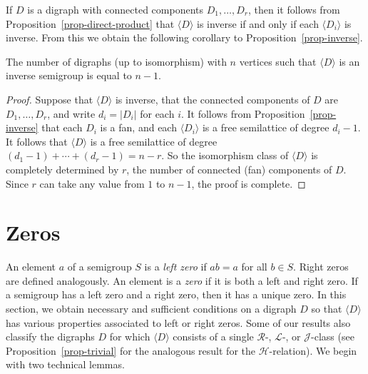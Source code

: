 \documentclass[ALCO,ThmDefs,Unicode,epreuves]{cedram}
\newcommand{\genset}[1]{\langle#1\rangle}
\newcommand{\LL}{\mathcal{L}}
\newcommand{\R}{\mathcal{R}}
\newcommand{\J}{\mathcal{J}}
\newcommand{\Hcal}{\mathcal{H}}
\begin{document}
If $D$ is a digraph with connected components $D_1, \ldots, D_r$, then 
it follows from Proposition~\ref{prop-direct-product} that $\genset D$ is
inverse if and only if each $\genset{D_i}$ is inverse. From this we obtain the
following corollary to Proposition~\ref{prop-inverse}.

\begin{corollary}
 The number of digraphs (up to isomorphism) with $n$ vertices such that
 $\genset{D}$ is an inverse semigroup is equal to $n-1$.
\end{corollary}
\begin{proof}
 Suppose that $\genset D$ is inverse, that the connected components of $D$ are $D_1, \ldots, D_r$, and write $d_i=|D_i|$ for each $i$. It
 follows from Proposition~\ref{prop-inverse} that each $D_i$ is a fan, and
 each $\genset{D_i}$ is a free semilattice of degree $d_i-1$. It follows that
 $\genset D$ is a free semilattice of degree $(d_1-1)+\cdots+(d_r-1)=n-r$. So
 the isomorphism class of $\genset D$ is completely determined by $r$, the
 number of connected (fan) components of $D$. Since $r$ can take any value
 from $1$ to $n-1$, the proof is complete.
\end{proof}




\section{Zeros} \label{sec:zeros}

An element $a$ of a semigroup $S$ is a \emph{left zero} if $ab=a$
for all $b\in S$. Right zeros are defined analogously. An element is a
\emph{zero} if it is both a left and right zero. If a semigroup has a left
zero and a right zero, then it has a unique zero. In this section, we obtain
necessary and sufficient conditions on a digraph $D$ so that $\genset{D}$ has
various properties associated to left or right zeros. Some of our results
also classify the digraphs $D$ for which $\genset{D}$ consists of a single
$\R$-, $\LL$-, or $\J$-class (see Proposition~\ref{prop-trivial} for the analogous
result for the $\Hcal$-relation). We begin with two technical lemmas.
\end{document}

